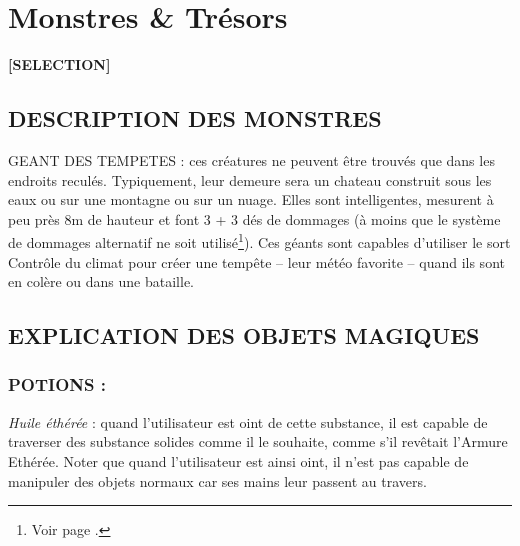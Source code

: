 \newpage
{}\section*{Monstres \& Trésors}

\begin{center}
\textbf{[SELECTION]}
\end{center}

\subsection*{DESCRIPTION DES MONSTRES}

\label{monstre-geant-des-tempetes}GEANT DES TEMPETES : ces créatures ne peuvent être trouvés que dans les endroits reculés. Typiquement, leur demeure sera un chateau construit sous les eaux ou sur une montagne ou sur un nuage. Elles sont intelligentes, mesurent à peu près 8m de hauteur et font 3 + 3 dés de dommages (à moins que le système de dommages alternatif ne soit utilisé\footnote{Voir page \pageref{greyhawk-dommages-monstres}.}). Ces géants sont capables d'utiliser le sort Contrôle du climat pour créer une tempête -- leur météo favorite -- quand ils sont en colère ou dans une bataille.

\subsection*{EXPLICATION DES OBJETS MAGIQUES}

\subsubsection*{POTIONS :}

\label{objet-huile-etheree}\textit{Huile éthérée} : quand l'utilisateur est oint de cette substance, il est capable de traverser des substance solides comme il le souhaite, comme s'il revêtait l'Armure Ethérée. Noter que quand l'utilisateur est ainsi oint, il n'est pas capable de manipuler des objets normaux car ses mains leur passent au travers.
